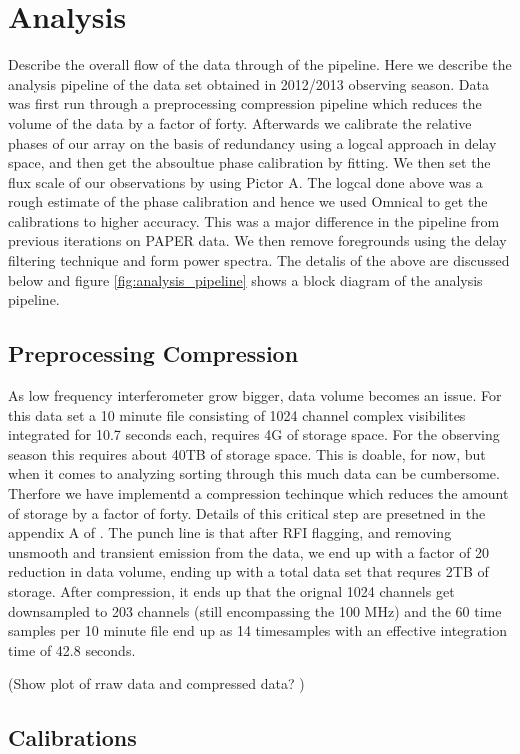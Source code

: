 \documentclass[twocolumn,numberedappendix]{emulateapj}
\begin{document}
\section{Analysis}
Describe the overall flow of the data through of the pipeline.
Here we describe the analysis pipeline of the data set obtained in 2012/2013
observing season. 
Data was first run through a preprocessing compression pipeline which reduces
the volume of the data by a factor of forty. Afterwards we calibrate the
relative phases of our array on the basis of redundancy using a logcal approach
in delay space, and then get the absoultue phase calibration by fitting. We then
set the flux scale of our observations by using Pictor A. The logcal done above
was a rough estimate of the phase calibration and hence we used Omnical to get
the calibrations to higher accuracy. This was a major difference in the pipeline
from previous iterations on PAPER data. We then remove foregrounds using the
delay filtering technique and form power spectra. The detalis of the above are
discussed below and figure \ref{fig:analysis_pipeline} shows a block diagram of
the analysis pipeline.

\subsection{Preprocessing Compression}
As low frequency interferometer grow bigger, data volume becomes an issue. For
this data set a 10 minute file consisting of 1024 channel complex visibilites
integrated for 10.7 seconds each, requires 4G of storage space. For the
observing season this requires about 40TB of storage space. This is doable, for
now, but when it comes to analyzing sorting through this much data can be
cumbersome. Therfore we have implementd a compression techinque which reduces
the amount of storage by a factor of forty. 
Details of this critical step are presetned in the appendix A of
\citep{parsons2014a}.  The punch line is that after RFI flagging, and removing
unsmooth and transient emission from the data, we end up with a factor of 20
reduction in data volume, ending up with a total data set that requres 2TB of
storage. After compression, it ends up that the orignal 1024 channels get
downsampled to 203 channels (still encompassing the 100 MHz) and the 60 time
samples per 10 minute file end up as 14 timesamples with an effective
integration time of 42.8 seconds. 

(Show plot of rraw data and compressed data? )
\subsection{Calibrations}
\end{document}

